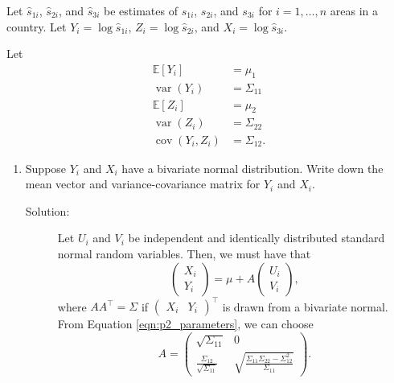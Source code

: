 \documentclass[letterpaper,11pt]{article}
\begin{document}
\begin{enumerate}
  Let $\hat{s}_{1i}$, $\hat{s}_{2i}$, and $\hat{s}_{3i}$ be estimates of
  $s_{1i}$, $s_{2i}$, and $s_{3i}$ for $i = 1,\ldots,n$ areas in a country. Let
  $Y_i = \log \hat{s}_{1i}$, $Z_i = \log \hat{s}_{2i}$, and
  $X_i= \log\hat{s}_{3i}$.

  Let
  \begin{align}
    \mathbb{E}\left[Y_i\right]
    &= \mu_1 \nonumber\\
    \operatorname{var}\left(Y_i\right)
    &= \Sigma_{11} \nonumber\\
    \mathbb{E}\left[Z_i\right]
    &= \mu_2 \nonumber\\
    \operatorname{var}\left(Z_i\right)
    &= \Sigma_{22} \nonumber\\
    \operatorname{cov}\left(Y_i,Z_i\right)
    &= \Sigma_{12}. \label{eqn:p2_parameters}
  \end{align}

  \begin{enumerate}
  \item Suppose $Y_i$ and $X_i$ have a bivariate normal distribution. Write down
    the mean vector and variance-covariance matrix for $Y_i$ and $X_i$.
    \begin{description}
    \item[Solution:] Let $U_i$ and $V_i$ be independent and identically
      distributed standard normal random variables. Then, we must have that
      \begin{equation}
        \begin{pmatrix}
          X_i \\
          Y_i
        \end{pmatrix} = \mu + A\begin{pmatrix}
          U_i \\
          V_i
        \end{pmatrix},
        \label{eqn:p2_bivariate_normal_definition}
      \end{equation}
      where $AA^\intercal = \Sigma$ if $\begin{pmatrix}
        X_i & Y_i
      \end{pmatrix}^\intercal$ is drawn from a bivariate normal. From Equation
      \ref{eqn:p2_parameters}, we can choose
      \begin{equation}
        A = \begin{pmatrix}
          \sqrt{\Sigma_{11}} & 0 \\
          \frac{\Sigma_{12}}{\sqrt{\Sigma_{11}}} &
          \sqrt{\frac{\Sigma_{11}\Sigma_{22} - \Sigma_{12}^2}{\Sigma_{11}} }
        \end{pmatrix}.
        \label{eqn:p2_bivariate_normal_A}
      \end{equation}
      

\end{description}
\end{enumerate}
\end{enumerate}
\end{document}

